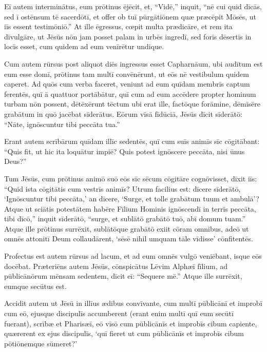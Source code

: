 \Versus Eī autem interminātus, eum prōtinus ējēcit,
\Versus et, ``Vidē,'' inquit, ``nē cui quid dīcās, sed ī ostēnsum tē sacerdōtī, et offer ob tuī pūrgātiōnem quæ præcēpit Mōsēs, ut iīs essent testimōniō.''
\Versus At ille ēgressus, cœpit multa prædicāre, et rem ita dīvulgāre, ut Jēsūs nōn jam posset palam in urbēs ingredī, sed forīs dēsertīs in locīs esset, cum quidem ad eum venīrētur undique.



\Caput
\Versus Cum autem rūrsus post aliquot diēs ingressus esset Capharnāum,
\Versus ubi audītum est eum esse domī, prōtinus tam multī convēnērunt, ut eōs nē vestibulum quidem caperet.
\Versus Ad quōs cum verba faceret, veniunt ad eum quīdam membrīs captum ferentēs, quī ā quattuor portābātur,
\Versus quī cum ad eum accēdere propter hominum turbam nōn possent, dētēxērunt tēctum ubi erat ille, factōque forāmine, dēmīsēre grabātum in quō jacēbat sīderātus.
\Versus Eōrum vīsā fīdūciā, Jēsūs dīcit sīderātō: ``Nāte, ignōscuntur tibi peccāta tua.''

\Versus Erant autem scrībārum quīdam illīc sedentēs, quī cum suīs animīs sīc cōgitābant:
\Versus ``Quis fit, ut hic ita loquātur impiē? Quis potest ignōscere peccāta, nisi ūnus Deus?''

\Versus Tum Jēsūs, cum prōtinus animō suō eōs sīc sēcum cōgitāre cognōvisset, dīxit iīs: ``Quid ista cōgitātis cum vestrīs animīs?
\Versus Utrum facilius est: dīcere sīderātō, `Ignōscuntur tibi peccāta,' an dīcere, `Surge, et tolle grabātum tuum et ambulā'?
\Versus Atque ut sciātis potestātem habēre Fīlium Hominis ignōscendī in terrīs peccāta,
\Versus tibi dīcō,'' inquit sīderātō, ``surge, et sublātō grabātō tuō, abī domum tuam.''
\Versus Atque ille prōtinus surrēxit, sublātōque grabātō exiit cōram omnibus, adeō ut omnēs attonitī Deum collaudārent, `sēsē nihil umquam tāle vīdisse' cōnfitentēs.

\Versus Profectus est autem rūrsus ad lacum, et ad eum omnēs vulgō veniēbant, isque eōs docēbat.
\Versus Præteriēns autem Jēsūs, cōnspicātus Lēvim Alphæī fīlium, ad pūblicānōrum mēnsam sedentem, dīcit eī: ``Sequere mē.'' Atque ille surrēxit, eumque secūtus est.

\Versus Accidit autem ut Jēsū in illīus ædibus convīvante, cum multī pūblicānī et improbī cum eō, ejusque discipulīs accumberent (erant enim multī quī eum secūtī fuerant),
\Versus scrībæ et Pharisæī, eō vīsō cum pūblicānīs et improbīs cibum capiente, quærerent ex ejus discipulīs, `quī fieret ut cum pūblicānīs et improbīs cibum pōtiōnemque sūmeret?'

